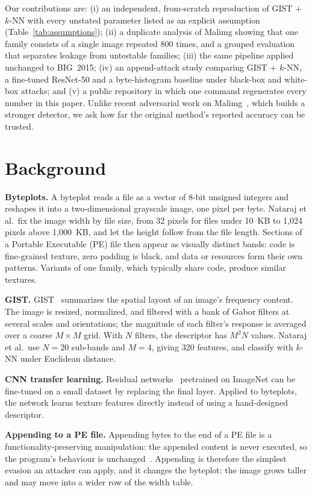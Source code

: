 \documentclass[conference]{IEEEtran}
\begin{document}
Our contributions are:
(i) an independent, from-scratch reproduction of GIST + $k$-NN with every unstated
parameter listed as an explicit assumption (Table~\ref{tab:assumptions});
(ii) a duplicate analysis of Malimg showing that one family consists of a single
image repeated 800 times, and a grouped evaluation that separates leakage from
untestable families;
(iii) the same pipeline applied unchanged to BIG~2015;
(iv) an append-attack study comparing GIST + $k$-NN, a fine-tuned ResNet-50 and a
byte-histogram baseline under black-box and white-box attacks; and
(v) a public repository in which one command regenerates every number in this paper.
Unlike recent adversarial work on Malimg~\cite{tariq2026framework}, which builds a
stronger detector, we ask how far the original method's reported accuracy can be
trusted.

\section{Background}
\textbf{Byteplots.} A byteplot reads a file as a vector of 8-bit unsigned integers
and reshapes it into a two-dimensional grayscale image, one pixel per byte. Nataraj et
al.\ fix the image width by file size, from 32 pixels for files under 10~KB to 1,024
pixels above 1,000~KB, and let the height follow from the file length. Sections of a
Portable Executable (PE) file then appear as visually distinct bands: code is
fine-grained texture, zero padding is black, and data or resources form their own
patterns. Variants of one family, which typically share code, produce similar
textures.

\textbf{GIST.} GIST~\cite{oliva2001gist} summarizes the spatial layout of an image's
frequency content. The image is resized, normalized, and filtered with a bank of
Gabor filters at several scales and orientations; the magnitude of each filter's
response is averaged over a coarse $M \times M$ grid. With $N$ filters, the
descriptor has $M^2 N$ values. Nataraj et al.\ use $N = 20$ sub-bands and $M = 4$,
giving 320 features, and classify with $k$-NN under Euclidean distance.

\textbf{CNN transfer learning.} Residual networks~\cite{he2016resnet} pretrained on
ImageNet can be fine-tuned on a small dataset by replacing the final layer. Applied to
byteplots, the network learns texture features directly instead of using a
hand-designed descriptor.

\textbf{Appending to a PE file.} Appending bytes to the end of a PE file is a
functionality-preserving manipulation: the appended content is never executed, so the
program's behaviour is unchanged~\cite{kolosnjaji2018adversarial,demetrio2021exemples}.
Appending is therefore the simplest evasion an attacker can apply, and it
changes the byteplot: the image grows taller and may move into a wider row of the
width table.
\end{document}

